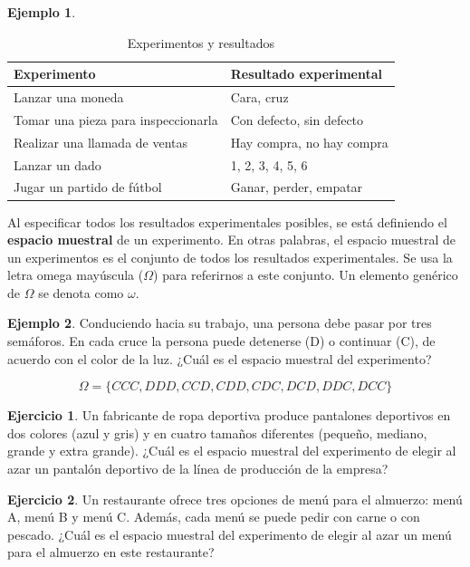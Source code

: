 \documentclass[
  11pt,
]{book}
\theoremstyle{definition}
\theoremstyle{definition}
\newtheorem{example}{Ejemplo}[chapter]
\theoremstyle{definition}
\newtheorem{exercise}{Ejercicio}[chapter]
\theoremstyle{definition}
\theoremstyle{remark}
\begin{document}
\begin{example}
\leavevmode

\begin{table}[H]
\centering
\caption{\label{tab:experimentos}Experimentos y resultados}
\centering
\begin{tabular}[t]{ll}
\toprule
Experimento & Resultado experimental\\
\midrule
Lanzar una moneda & Cara, cruz\\
Tomar una pieza para inspeccionarla & Con defecto, sin defecto\\
Realizar una llamada de ventas & Hay compra, no hay compra\\
Lanzar un dado & 1, 2, 3, 4, 5, 6\\
Jugar un partido de fútbol & Ganar, perder, empatar\\
\bottomrule
\end{tabular}
\end{table}

\end{example}

Al especificar todos los resultados experimentales posibles, se está definiendo el \textbf{espacio muestral} de un experimento. En otras palabras, el espacio muestral de un experimentos es el conjunto de todos los resultados experimentales. Se usa la letra omega mayúscula (\(\Omega\)) para referirnos a este conjunto. Un elemento genérico de \(\Omega\) se denota como \(\omega\).

\begin{example}
Conduciendo hacia su trabajo, una persona debe pasar por tres semáforos. En cada cruce la persona puede detenerse (D) o continuar (C), de acuerdo con el color de la luz. ¿Cuál es el espacio muestral del experimento?

\[\Omega = \lbrace CCC, DDD, CCD, CDD, CDC, DCD, DDC, DCC \rbrace\]
\end{example}

\begin{exercise}
Un fabricante de ropa deportiva produce pantalones deportivos en dos colores (azul y gris) y en cuatro tamaños diferentes (pequeño, mediano, grande y extra grande). ¿Cuál es el espacio muestral del experimento de elegir al azar un pantalón deportivo de la línea de producción de la empresa?
\end{exercise}

\begin{exercise}
Un restaurante ofrece tres opciones de menú para el almuerzo: menú A, menú B y menú C. Además, cada menú se puede pedir con carne o con pescado. ¿Cuál es el espacio muestral del experimento de elegir al azar un menú para el almuerzo en este restaurante?
\end{exercise}
\end{document}
